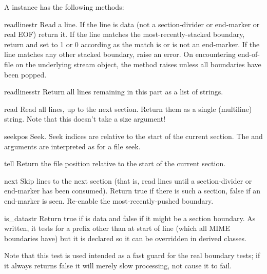 A  instance has the following methods:

\begin{methoddesc}{readline}{str}
Read a line.  If the line is data (not a section-divider or end-marker
or real EOF) return it.  If the line matches the most-recently-stacked
boundary, return  and set  to 1 or 0 according as
the match is or is not an end-marker.  If the line matches any other
stacked boundary, raise an error.  On encountering end-of-file on the
underlying stream object, the method raises  unless
all boundaries have been popped.
\end{methoddesc}

\begin{methoddesc}{readlines}{str}
Return all lines remaining in this part as a list of strings.
\end{methoddesc}

\begin{methoddesc}{read}{}
Read all lines, up to the next section.  Return them as a single
(multiline) string.  Note that this doesn't take a size argument!
\end{methoddesc}

\begin{methoddesc}{seek}{pos}
Seek.  Seek indices are relative to the start of the current section.
The  and  arguments are interpreted as for a file
seek.
\end{methoddesc}

\begin{methoddesc}{tell}{}
Return the file position relative to the start of the current section.
\end{methoddesc}

\begin{methoddesc}{next}{}
Skip lines to the next section (that is, read lines until a
section-divider or end-marker has been consumed).  Return true if
there is such a section, false if an end-marker is seen.  Re-enable
the most-recently-pushed boundary.
\end{methoddesc}

\begin{methoddesc}{is_data}{str}
Return true if  is data and false if it might be a section
boundary.  As written, it tests for a prefix other than  at
start of line (which all MIME boundaries have) but it is declared so
it can be overridden in derived classes.

Note that this test is used intended as a fast guard for the real
boundary tests; if it always returns false it will merely slow
processing, not cause it to fail.
\end{methoddesc}

